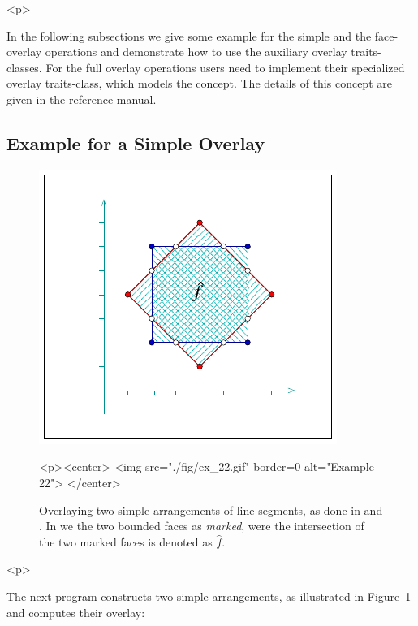\begin{ccHtmlOnly}<p>\end{ccHtmlOnly}
In the following subsections we give some example for the simple and the
face-overlay operations and demonstrate how to use the auxiliary overlay
traits-classes. For the full overlay operations users need to implement
their specialized overlay traits-class, which models the 
concept. The details of this concept are given in the reference manual.

\subsection{Example for a Simple Overlay}
\label{arr_ssec:simp_ovl}
%
\begin{figure}[!htp]
\begin{ccTexOnly}
  \begin{center}
  \includegraphics{Arrangement_2/fig/ex_22}
  \end{center}
\end{ccTexOnly}
\begin{ccHtmlOnly}
  <p><center>
  <img src="./fig/ex_22.gif" border=0 alt="Example 22">
  </center>
\end{ccHtmlOnly}
\caption{Overlaying two simple arrangements of line segments, as done
in  and . In  we 
the two bounded faces as {\em marked}, were the intersection of the two
marked faces is denoted as $\hat{f}$.}
\label{arr_fig:ex_22}
\end{figure}

\begin{ccHtmlOnly}<p>\end{ccHtmlOnly}
The next program constructs two simple arrangements, as illustrated in
Figure~\ref{arr_fig:ex_22} and computes their overlay:

